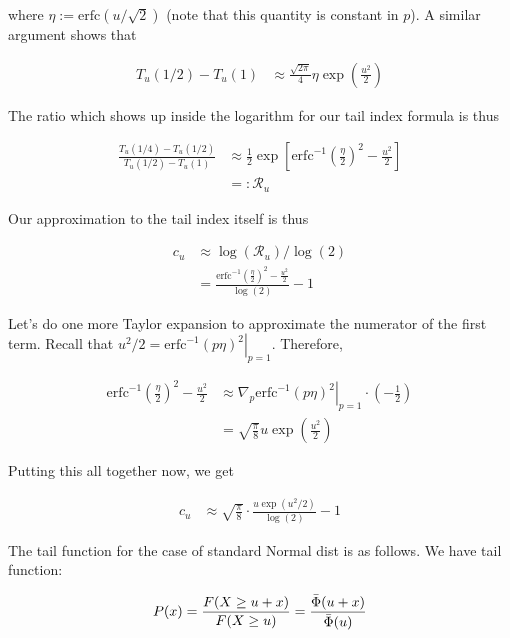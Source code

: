 \documentclass{article}
\begin{document}
where $\eta:= \mathrm{erfc}(u / \sqrt{2})$ (note that this quantity is constant in $p$). A similar argument shows that 

\begin{align}
    T_u(1/2) - T_u(1) &\approx \frac{\sqrt{2\pi}}{4} \eta \exp \left( \frac{u^2}{2} \right)
\end{align}

The ratio which shows up inside the logarithm for our tail index formula is thus

\begin{align}
    \frac{T_u(1/4) - T_u(1/2)}{T_u(1/2) - T_u(1)} & \approx \frac{1}{2} \exp \left[ \mathrm{erfc}^{-1} \left( \frac{\eta}{2} \right)^2 - \frac{u^2}{2} \right]\\
    &=: \mathcal{R}_u
\end{align}

Our approximation to the tail index itself is thus

\begin{align}
    c_u &\approx \log(\mathcal{R}_u) / \log(2)\\
    &= \frac{\mathrm{erfc}^{-1} \left( \frac{\eta}{2} \right)^2 - \frac{u^2}{2}}{\log(2)} - 1
\end{align}

Let's do one more Taylor expansion to approximate the numerator of the first term. Recall that $u^2 / 2 = \left. \mathrm{erfc}^{-1}(p \eta)^2 \right|_{p=1}$. Therefore,

\begin{align}
    \mathrm{erfc}^{-1} \left( \frac{\eta}{2} \right)^2 - \frac{u^2}{2} & \approx \nabla_p \left. \mathrm{erfc}^{-1}(p \eta)^2 \right|_{p=1} \cdot \left( - \frac{1}{2} \right)\\
    &= \sqrt{\frac{\pi}{8}} u \exp \left( \frac{u^2}{2} \right)
\end{align}

Putting this all together now, we get 

\begin{align}
    c_u & \approx \sqrt{\frac{\pi}{8}} \cdot  \frac{u  \exp(u^2 / 2)}{\log(2)} - 1 \label{eq:approx_tail_index}
\end{align}



The tail function for the case of standard Normal dist is as follows. We have tail function:

\begin{align}
    P(x) = \frac{F(X \ge u + x)}{F(X \ge u)} = \frac{\Bar \Phi(u+x)}{\Bar \Phi(u)}
\end{align}
\end{document}
